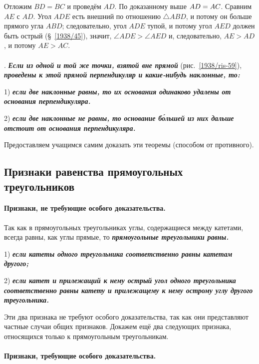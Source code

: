 Отложим $BD=BC$ и проведём $AD$.
По доказанному выше $AD \z= AC$.
Сравним $AE$ с $AD$.
Угол $ADE$ есть внешний по отношению $\triangle ABD$, и потому он больше прямого угла $ABD$;
следовательно, угол $ADE$ тупой, и потому угол $AED$ должен быть острый (§~\ref{1938/45}), значит, $\angle ADE>\angle AED$ и, следовательно, $AE>AD$, и потому $AE>AC$.

\paragraph{}\label{1938/55}
.
\textbf{\emph{Если из одной и той же точки, взятой вне прямой}} (рис.~\ref{1938/ris-59}), \textbf{\emph{проведены к этой прямой перпендикуляр и какие-нибудь наклонные, то:}}

1) \textbf{\emph{если две наклонные равны, то их основания одинаково удалены от основания перпендикуляра.}}

2) \textbf{\emph{если две наклонные не равны, то основание б\'{о}льшей из них дальше отстоит от основания перпендикуляра.}}

Предоставляем учащимся самим доказать эти теоремы (способом от противного).

\subsection*{Признаки равенства прямоугольных треугольников}

\paragraph{Признаки, не требующие особого доказательства.}\label{1938/56}
Так как в прямоугольных треугольниках углы, содержащиеся между катетами, всегда равны, как углы прямые, то \textbf{\emph{прямоугольные треугольники равны.}}

1) \textbf{\emph{если катеты одного треугольника соответственно равны катетам другого;}}

2) \textbf{\emph{если катет и прилежащий к нему острый угол одного треугольника соответственно равны катету и прилежащему к нему острому углу другого треугольника.}}

Эти два признака не требуют особого доказательства, так как они представляют частные случаи общих признаков.
Докажем ещё два следующих признака, относящихся только к прямоугольным треугольникам.

\paragraph{Признаки, требующие особого доказательства.}\label{1938/57}\ 

